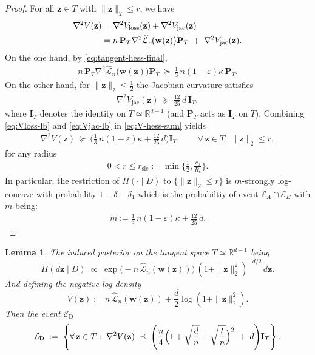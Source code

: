 \documentclass{article}
\theoremstyle{plain}
\newtheorem{lemma}[theorem]{Lemma}
\theoremstyle{definition}
\theoremstyle{remark}
\begin{document}
{\begin{proof}
For all $\mathbf z\in T$ with $\|\mathbf z\|_2\le r$, we have
\begin{align}
\nabla^2 V(\mathbf z)
&=
\nabla^2 V_{\mathrm{loss}}(\mathbf z)+\nabla^2 V_{\mathrm{jac}}(\mathbf z) \notag\\
&=
n\,\mathbf P_T \nabla^2 \widehat{\mathcal L}_n\!\big(\mathbf w(\mathbf z)\big)\mathbf P_T
\;+\;
\nabla^2 V_{\mathrm{jac}}(\mathbf z).
\label{eq:V-hess-sum}
\end{align}
On the one hand, by \eqref{eq:tangent-hess-final},
\begin{align}
n\,\mathbf P_T \nabla^2 \widehat{\mathcal L}_n\!\big(\mathbf w(\mathbf z)\big)\mathbf P_T
~\succeq~
\frac{1}{3}\,n(1-\varepsilon)\kappa\,\mathbf P_T.
\label{eq:Vloss-lb}
\end{align}
On the other hand, for $\|\mathbf z\|_2\le \tfrac12$ the Jacobian curvature satisfies
\begin{align}
\nabla^2 V_{\mathrm{jac}}(\mathbf z)
~\succeq~
\frac{12}{25}\,d\,\mathbf I_T,
\label{eq:Vjac-lb}
\end{align}
where $\mathbf I_T$ denotes the identity on $T\simeq\mathbb R^{d-1}$ (and $\mathbf P_T$ acts as $\mathbf I_T$ on $T$).
Combining \eqref{eq:Vloss-lb} and \eqref{eq:Vjac-lb} in \eqref{eq:V-hess-sum} yields
\begin{align}
\nabla^2 V(\mathbf z)
~\succeq~
\Big(\frac{1}{3}\,n(1-\varepsilon)\kappa+\frac{12}{25}\,d\Big)\mathbf I_T,
\qquad \forall~\mathbf z\in T:\ \|\mathbf z\|_2\le r,
\label{eq:V-final-lb}
\end{align}
for any radius
\begin{align}
0<r\le r_{\mathrm{slc}}
:=\min\Big\{\tfrac12,\frac{c_0}{R_e}\Big\}.
\label{eq:rslc-def}
\end{align}
In particular, the restriction of $\Pi(\cdot\mid D)$ to $\{\|\mathbf z\|_2\le r\}$ is
$m$-strongly log-concave with probability $1-\delta-\delta_{1}$ which is the probabiltiy of event $\mathcal{E}_{A} \cap \mathcal{E}_{B}$ with $m$ being:
\begin{align}
m:=\frac{1}{3}\,n(1-\varepsilon)\kappa+\frac{12}{25}\,d.
\end{align}

\end{proof}
\begin{lemma}
\label{lem:global_slc_tangent}
The induced posterior on the tangent space $T\simeq\mathbb R^{d-1}$ being
\[
\Pi(d\mathbf z \mid D)
\;\propto\;
\exp\!\big(-n\,\widehat{\mathcal L}_n(\mathbf w(\mathbf z))\big)\,
(1+\|\mathbf z\|_2^2)^{-d/2}\,d\mathbf z .
\]
And defining the negative log-density
\[
V(\mathbf z)
:= n\,\widehat{\mathcal L}_n(\mathbf w(\mathbf z))
+ \frac{d}{2}\log(1+\|\mathbf z\|_2^2).
\]
Then the event $\mathcal E_{\mathrm D}$
\[
\mathcal E_{\mathrm D}
\;:=\;
\left\{
\forall\,\mathbf z\in T:\;
\nabla^2 V(\mathbf z)
\;\preceq\;
\Bigg(
\frac{n}{4}
\Bigl(1+\sqrt{\frac{d}{n}}+\sqrt{\frac{t}{n}}\Bigr)^2
\;+\;
d
\Bigg)\mathbf I_{ T}
\right\}.
\]


\end{lemma}}
\end{document}
